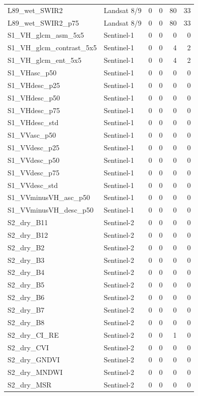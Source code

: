 \begin{tabular}{llrrrr}
L89_wet_SWIR2 & Landsat 8/9 & 0 & 0 & 80 & 33 \\
L89_wet_SWIR2_p75 & Landsat 8/9 & 0 & 0 & 80 & 33 \\
S1_VH_glcm_asm_5x5 & Sentinel-1 & 0 & 0 & 0 & 0 \\
S1_VH_glcm_contrast_5x5 & Sentinel-1 & 0 & 0 & 4 & 2 \\
S1_VH_glcm_ent_5x5 & Sentinel-1 & 0 & 0 & 4 & 2 \\
S1_VHasc_p50 & Sentinel-1 & 0 & 0 & 0 & 0 \\
S1_VHdesc_p25 & Sentinel-1 & 0 & 0 & 0 & 0 \\
S1_VHdesc_p50 & Sentinel-1 & 0 & 0 & 0 & 0 \\
S1_VHdesc_p75 & Sentinel-1 & 0 & 0 & 0 & 0 \\
S1_VHdesc_std & Sentinel-1 & 0 & 0 & 0 & 0 \\
S1_VVasc_p50 & Sentinel-1 & 0 & 0 & 0 & 0 \\
S1_VVdesc_p25 & Sentinel-1 & 0 & 0 & 0 & 0 \\
S1_VVdesc_p50 & Sentinel-1 & 0 & 0 & 0 & 0 \\
S1_VVdesc_p75 & Sentinel-1 & 0 & 0 & 0 & 0 \\
S1_VVdesc_std & Sentinel-1 & 0 & 0 & 0 & 0 \\
S1_VVminusVH_asc_p50 & Sentinel-1 & 0 & 0 & 0 & 0 \\
S1_VVminusVH_desc_p50 & Sentinel-1 & 0 & 0 & 0 & 0 \\
S2_dry_B11 & Sentinel-2 & 0 & 0 & 0 & 0 \\
S2_dry_B12 & Sentinel-2 & 0 & 0 & 0 & 0 \\
S2_dry_B2 & Sentinel-2 & 0 & 0 & 0 & 0 \\
S2_dry_B3 & Sentinel-2 & 0 & 0 & 0 & 0 \\
S2_dry_B4 & Sentinel-2 & 0 & 0 & 0 & 0 \\
S2_dry_B5 & Sentinel-2 & 0 & 0 & 0 & 0 \\
S2_dry_B6 & Sentinel-2 & 0 & 0 & 0 & 0 \\
S2_dry_B7 & Sentinel-2 & 0 & 0 & 0 & 0 \\
S2_dry_B8 & Sentinel-2 & 0 & 0 & 0 & 0 \\
S2_dry_CI_RE & Sentinel-2 & 0 & 0 & 1 & 0 \\
S2_dry_CVI & Sentinel-2 & 0 & 0 & 0 & 0 \\
S2_dry_GNDVI & Sentinel-2 & 0 & 0 & 0 & 0 \\
S2_dry_MNDWI & Sentinel-2 & 0 & 0 & 0 & 0 \\
S2_dry_MSR & Sentinel-2 & 0 & 0 & 0 & 0 \\

\end{tabular}
